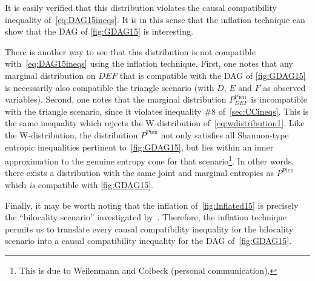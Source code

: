 \documentclass[aps,english,superscriptaddress,onecolumn,twoside,longbibliography,pra,floatfix,fleqn,nofootinbib]{revtex4-1}%
\theoremstyle{definition}
\begin{document}
It is easily verified that this distribution violates the causal compatibility inequality of~\cref{eq:DAG15ineqs}.  It is in this sense that the inflation technique can show that the DAG of \cref{fig:GDAG15} is interesting. 

There is another way to see that this distribution is not compatible with~\cref{eq:DAG15ineqs} using the inflation technique.  First, one notes that any marginal distribution on $DEF$ that is compatible with the DAG of \cref{fig:GDAG15} is necessarily also compatible the triangle scenario (with $D$, $E$ and $F$ as observed variables).
Second, one notes that the marginal distribution $P^{\text{Pien}}_{D E F}$ is incompatible with the triangle scenario, since it violates inequality \#8 of~\cref{sec:CCineqs}.  This is the same inequality which rejects the W-distribution of~\cref{eq:wdistribution1}.
Like the W-distribution, the distribution $P^{\text{Pien}}$
 not only satisfies all Shannon-type entropic inequalities pertinent to~\cref{fig:GDAG15}, but lies within an inner approximation to the genuine entropy cone for that scenario\footnote{This is due to Weilenmann and Colbeck (personal communication).}. In other words, there exists a distribution with the same joint and marginal entropies as  $P^{\text{Pien}}$ which \emph{is} compatible with \cref{fig:GDAG15}.

Finally, it may be worth noting that the inflation of~\cref{fig:Inflated15} is precisely the ``bilocality scenario'' investigated by~\citet{BilocalCorrelations}.  Therefore, the inflation technique permits us to translate every causal compatibility inequality for the bilocality scenario into a causal compatibility inequality for the DAG of~\cref{fig:GDAG15}.

\end{document}
